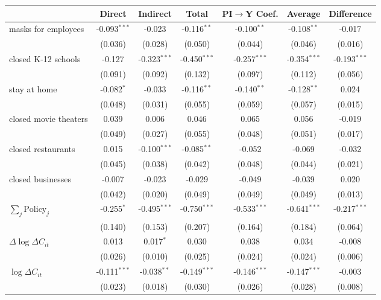 
\begin{tabular}{lccccc|>{}c}
\toprule
  & Direct & Indirect & Total & PI$\to$Y Coef. & Average & Difference\\
\midrule
masks for employees & -0.093$^{***}$ & -0.023 & -0.116$^{**}$ & -0.100$^{**}$ & -0.108$^{**}$ & -0.017\\
 & (0.036) & (0.028) & (0.050) & (0.044) & (0.046) & (0.016)\\
closed K-12 schools & -0.127 & -0.323$^{***}$ & -0.450$^{***}$ & -0.257$^{***}$ & -0.354$^{***}$ & -0.193$^{***}$\\
 & (0.091) & (0.092) & (0.132) & (0.097) & (0.112) & (0.056)\\
stay at home & -0.082$^{*}$ & -0.033 & -0.116$^{**}$ & -0.140$^{**}$ & -0.128$^{**}$ & 0.024\\
 & (0.048) & (0.031) & (0.055) & (0.059) & (0.057) & (0.015)\\
closed movie theaters & 0.039 & 0.006 & 0.046 & 0.065 & 0.056 & -0.019\\
 & (0.049) & (0.027) & (0.055) & (0.048) & (0.051) & (0.017)\\
closed restaurants & 0.015 & -0.100$^{***}$ & -0.085$^{**}$ & -0.052 & -0.069 & -0.032\\
 & (0.045) & (0.038) & (0.042) & (0.048) & (0.044) & (0.021)\\
closed businesses & -0.007 & -0.023 & -0.029 & -0.049 & -0.039 & 0.020\\
 & (0.042) & (0.020) & (0.049) & (0.049) & (0.049) & (0.013)\\
$\sum_j \mathrm{Policy}_j$ & -0.255$^{*}$ & -0.495$^{***}$ & -0.750$^{***}$ & -0.533$^{***}$ & -0.641$^{***}$ & -0.217$^{***}$\\
 & (0.140) & (0.153) & (0.207) & (0.164) & (0.184) & (0.064)\\
$\Delta \log \Delta C_{it}$ & 0.013 & 0.017$^{*}$ & 0.030 & 0.038 & 0.034 & -0.008\\
 & (0.026) & (0.010) & (0.025) & (0.024) & (0.024) & (0.006)\\
$\log \Delta C_{it}$ & -0.111$^{***}$ & -0.038$^{**}$ & -0.149$^{***}$ & -0.146$^{***}$ & -0.147$^{***}$ & -0.003\\
 & (0.023) & (0.018) & (0.030) & (0.026) & (0.028) & (0.008)\\
\bottomrule
\end{tabular}
